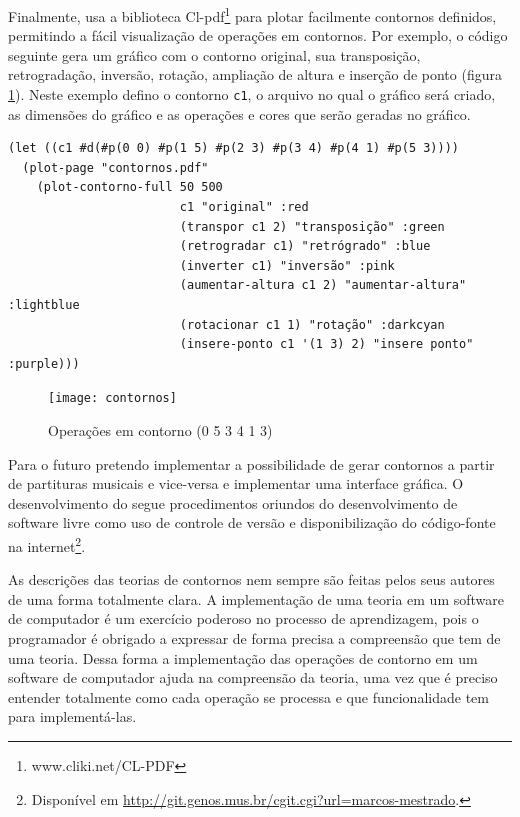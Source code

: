 Finalmente, \goiaba{} usa a biblioteca
Cl-pdf\footnote{www.cliki.net/CL-PDF} para plotar facilmente contornos
definidos, permitindo a fácil visualização de operações em contornos.
Por exemplo, o código seguinte gera um gráfico com o contorno
original, sua transposição, retrogradação, inversão, rotação,
ampliação de altura e inserção de ponto (figura
\ref{fig:operacoes}). Neste exemplo defino o contorno \verb!c1!, o
arquivo no qual o gráfico será criado, as dimensões do gráfico e as
operações e cores que serão geradas no gráfico.

\singlespacing
\begin{verbatim}
(let ((c1 #d(#p(0 0) #p(1 5) #p(2 3) #p(3 4) #p(4 1) #p(5 3))))
  (plot-page "contornos.pdf"
    (plot-contorno-full 50 500
                        c1 "original" :red
                        (transpor c1 2) "transposição" :green
                        (retrogradar c1) "retrógrado" :blue
                        (inverter c1) "inversão" :pink
                        (aumentar-altura c1 2) "aumentar-altura" :lightblue
                        (rotacionar c1 1) "rotação" :darkcyan
                        (insere-ponto c1 '(1 3) 2) "insere ponto" :purple)))
\end{verbatim}
\doublespacing

\begin{figure}
  \centering
  \texttt{[image: contornos]}
  \caption{Operações em contorno (0 5 3 4 1 3)}
  \label{fig:operacoes}
\end{figure}

Para o futuro pretendo implementar a possibilidade de gerar contornos
a partir de partituras musicais e vice-versa e implementar uma
interface gráfica. O desenvolvimento do \goiaba{} segue procedimentos
oriundos do desenvolvimento de software livre como uso de controle de
versão e disponibilização do código-fonte na
internet\footnote{Disponível em
  \url{http://git.genos.mus.br/cgit.cgi?url=marcos-mestrado}.}.

As descrições das teorias de contornos nem sempre são feitas pelos
seus autores de uma forma totalmente clara. A implementação de uma
teoria em um software de computador é um exercício poderoso no
processo de aprendizagem, pois o programador é obrigado a expressar de
forma precisa a compreensão que tem de uma teoria. Dessa forma a
implementação das operações de contorno em um software de computador
ajuda na compreensão da teoria, uma vez que é preciso entender
totalmente como cada operação se processa e que funcionalidade tem
para implementá-las.

